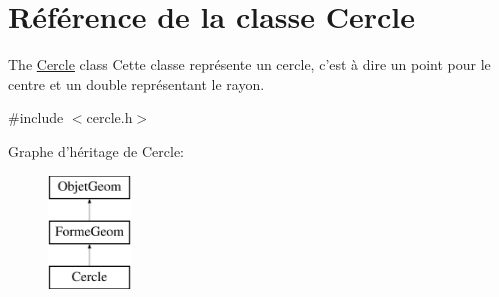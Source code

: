 \hypertarget{class_cercle}{\section{Référence de la classe Cercle}
\label{class_cercle}
}


The \hyperlink{class_cercle}{Cercle} class Cette classe représente un cercle, c'est à dire un point pour le centre et un double représentant le rayon.  




{\ttfamily \#include $<$cercle.\+h$>$}

Graphe d'héritage de Cercle\+:\begin{figure}[H]
\begin{center}
\leavevmode
\includegraphics[height=3.000000cm]{class_cercle}
\end{center}
\end{figure}
